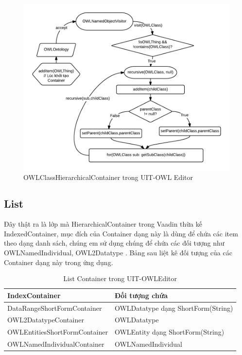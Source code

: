 \begin{figure}[h!]
	\centering
	\includegraphics[width=150mm]{Figures/owleditor_hccontainer.png}
	\caption{OWLClassHierarchicalContainer trong UIT-OWL Editor\label{overflow}}
\end{figure}
\subsection{List}
Đây thật ra là lớp mà HierarchicalContainer trong Vaadin thừa kế IndexedContainer, mục đích của Container dạng này là dùng để chứa các item theo dạng danh sách, chúng em sử dụng chúng để chứa các đối tượng như OWLNamedIndividual, OWL2Datatype . Bảng sau liệt kê đối tượng của các Container dạng này trong ứng dụng.
\begin{table}[h!]
	\centering
	\begin{tabular}{|l|l|}
		\hline
		IndexContainer  & Đối tượng chứa \\
		\hline
		DataRangeShortFormContainer	& OWLDatatype dạng ShortForm(String) \\ 
		\hline
		OWL2DatatypeContainer	& OWLDatatype  \\
		\hline
		OWLEntitiesShortFormContainer & OWLEntity dạng ShortForm(String)	\\	
		\hline
		OWLNamedIndividualContainer & OWLNamedIndividual  \\		
		\hline
	\end{tabular}
	\caption{List Container trong UIT-OWLEditor\label{overflow}}
\end{table}
